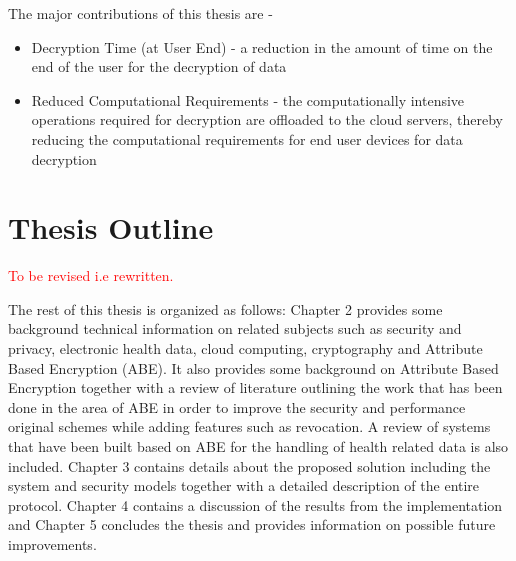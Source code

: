 The major contributions of this thesis are - 

\begin{itemize}
	
	\item Decryption Time (at User End) - a reduction in the amount of time on the end of the user for the decryption of data
	
	\item Reduced Computational Requirements - the computationally intensive operations required for decryption are offloaded to the cloud servers, thereby reducing the computational requirements for end user devices for data decryption
	
\end{itemize}

\section{Thesis Outline}

\textcolor{red}{To be revised i.e rewritten.}

The rest of this thesis is organized as follows: Chapter 2 provides some background technical information on related subjects such as security and privacy, electronic health data, cloud computing, cryptography and Attribute Based Encryption (ABE). It also provides some background on Attribute Based Encryption together with a review of literature outlining the work that has been done in the area of ABE in order to improve the security and performance original schemes while adding features such as revocation. A review of systems that have been built based on ABE for the handling of health related data is also included. Chapter 3 contains details about the proposed solution including the system and security models together with a detailed description of the entire protocol. Chapter 4 contains a discussion of the results from the implementation and Chapter 5 concludes the thesis and provides information on possible future improvements.

